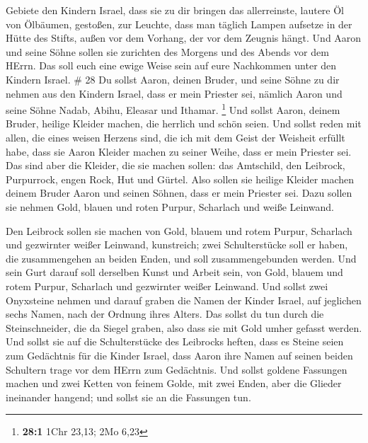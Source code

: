  Gebiete den Kindern Israel, dass sie zu dir bringen das
allerreinste, lautere Öl von Ölbäumen, gestoßen, zur Leuchte, dass man
täglich Lampen aufsetze  in der Hütte des Stifts, außen vor
dem Vorhang, der vor dem Zeugnis hängt. Und Aaron und seine Söhne sollen
sie zurichten des Morgens und des Abends vor dem HErrn. Das soll euch
eine ewige Weise sein auf eure Nachkommen unter den Kindern Israel. \#
28  Du sollst Aaron, deinen Bruder, und seine Söhne zu dir
nehmen aus den Kindern Israel, dass er mein Priester sei, nämlich Aaron
und seine Söhne Nadab, Abihu, Eleasar und Ithamar. \footnote{\textbf{28:1}
  1Chr 23,13; 2Mo 6,23}  Und sollst Aaron, deinem Bruder,
heilige Kleider machen, die herrlich und schön seien.  Und
sollst reden mit allen, die eines weisen Herzens sind, die ich mit dem
Geist der Weisheit erfüllt habe, dass sie Aaron Kleider machen zu seiner
Weihe, dass er mein Priester sei.  Das sind aber die
Kleider, die sie machen sollen: das Amtschild, den Leibrock, Purpurrock,
engen Rock, Hut und Gürtel. Also sollen sie heilige Kleider machen
deinem Bruder Aaron und seinen Söhnen, dass er mein Priester sei.
 Dazu sollen sie nehmen Gold, blauen und roten Purpur,
Scharlach und weiße Leinwand.

 Den Leibrock sollen sie machen von Gold, blauem und rotem
Purpur, Scharlach und gezwirnter weißer Leinwand, kunstreich;
 zwei Schulterstücke soll er haben, die zusammengehen an
beiden Enden, und soll zusammengebunden werden.  Und sein
Gurt darauf soll derselben Kunst und Arbeit sein, von Gold, blauem und
rotem Purpur, Scharlach und gezwirnter weißer Leinwand.  Und
sollst zwei Onyxsteine nehmen und darauf graben die Namen der Kinder
Israel,  auf jeglichen sechs Namen, nach der Ordnung ihres
Alters.  Das sollst du tun durch die Steinschneider, die da
Siegel graben, also dass sie mit Gold umher gefasst werden.
 Und sollst sie auf die Schulterstücke des Leibrocks
heften, dass es Steine seien zum Gedächtnis für die Kinder Israel, dass
Aaron ihre Namen auf seinen beiden Schultern trage vor dem HErrn zum
Gedächtnis.  Und sollst goldene Fassungen machen
 und zwei Ketten von feinem Golde, mit zwei Enden, aber die
Glieder ineinander hangend; und sollst sie an die Fassungen tun.

